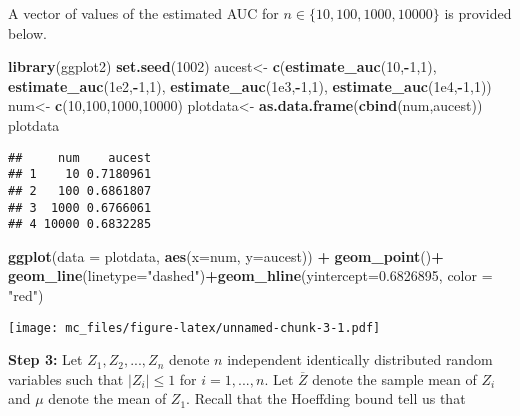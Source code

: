 \documentclass[
]{article}
\newenvironment{Shaded}{\begin{snugshade}}{\end{snugshade}}
\newcommand{\DataTypeTok}[1]{\textcolor[rgb]{0.13,0.29,0.53}{#1}}
\newcommand{\DecValTok}[1]{\textcolor[rgb]{0.00,0.00,0.81}{#1}}
\newcommand{\FloatTok}[1]{\textcolor[rgb]{0.00,0.00,0.81}{#1}}
\newcommand{\KeywordTok}[1]{\textcolor[rgb]{0.13,0.29,0.53}{\textbf{#1}}}
\newcommand{\NormalTok}[1]{#1}
\newcommand{\OperatorTok}[1]{\textcolor[rgb]{0.81,0.36,0.00}{\textbf{#1}}}
\newcommand{\StringTok}[1]{\textcolor[rgb]{0.31,0.60,0.02}{#1}}
\begin{document}
A vector of values of the estimated AUC for
\(n \in \{10,100,1000,10000\}\) is provided below.

\begin{Shaded}
\begin{Highlighting}[]
\KeywordTok{library}\NormalTok{(ggplot2)}
\KeywordTok{set.seed}\NormalTok{(}\DecValTok{1002}\NormalTok{)}
\NormalTok{aucest<-}\StringTok{ }\KeywordTok{c}\NormalTok{(}\KeywordTok{estimate_auc}\NormalTok{(}\DecValTok{10}\NormalTok{,}\OperatorTok{-}\DecValTok{1}\NormalTok{,}\DecValTok{1}\NormalTok{),}
\KeywordTok{estimate_auc}\NormalTok{(}\FloatTok{1e2}\NormalTok{,}\OperatorTok{-}\DecValTok{1}\NormalTok{,}\DecValTok{1}\NormalTok{),}
\KeywordTok{estimate_auc}\NormalTok{(}\FloatTok{1e3}\NormalTok{,}\OperatorTok{-}\DecValTok{1}\NormalTok{,}\DecValTok{1}\NormalTok{),}
\KeywordTok{estimate_auc}\NormalTok{(}\FloatTok{1e4}\NormalTok{,}\OperatorTok{-}\DecValTok{1}\NormalTok{,}\DecValTok{1}\NormalTok{))}
\NormalTok{num<-}\StringTok{ }\KeywordTok{c}\NormalTok{(}\DecValTok{10}\NormalTok{,}\DecValTok{100}\NormalTok{,}\DecValTok{1000}\NormalTok{,}\DecValTok{10000}\NormalTok{)}
\NormalTok{plotdata<-}\StringTok{ }\KeywordTok{as.data.frame}\NormalTok{(}\KeywordTok{cbind}\NormalTok{(num,aucest))}
\NormalTok{plotdata}
\end{Highlighting}
\end{Shaded}

\begin{verbatim}
##     num    aucest
## 1    10 0.7180961
## 2   100 0.6861807
## 3  1000 0.6766061
## 4 10000 0.6832285
\end{verbatim}

\begin{Shaded}
\begin{Highlighting}[]
\KeywordTok{ggplot}\NormalTok{(}\DataTypeTok{data =}\NormalTok{ plotdata, }\KeywordTok{aes}\NormalTok{(}\DataTypeTok{x=}\NormalTok{num, }\DataTypeTok{y=}\NormalTok{aucest)) }\OperatorTok{+}\StringTok{ }\KeywordTok{geom_point}\NormalTok{()}\OperatorTok{+}
\StringTok{    }\KeywordTok{geom_line}\NormalTok{(}\DataTypeTok{linetype=}\StringTok{"dashed"}\NormalTok{)}\OperatorTok{+}\KeywordTok{geom_hline}\NormalTok{(}\DataTypeTok{yintercept=}\FloatTok{0.6826895}\NormalTok{, }\DataTypeTok{color =} \StringTok{"red"}\NormalTok{)}
\end{Highlighting}
\end{Shaded}

\texttt{[image: mc\_files/figure-latex/unnamed-chunk-3-1.pdf]}

\textbf{Step 3:} Let \(Z_1, Z_2, ..., Z_n\) denote \(n\) independent
identically distributed random variables such that
\(\lvert Z_i \rvert \leq 1\) for \(i = 1, ..., n.\) Let \(\overline{Z}\)
denote the sample mean of \(Z_i\) and \(\mu\) denote the mean of
\(Z_1\). Recall that the Hoeffding bound tell us that
\end{document}
